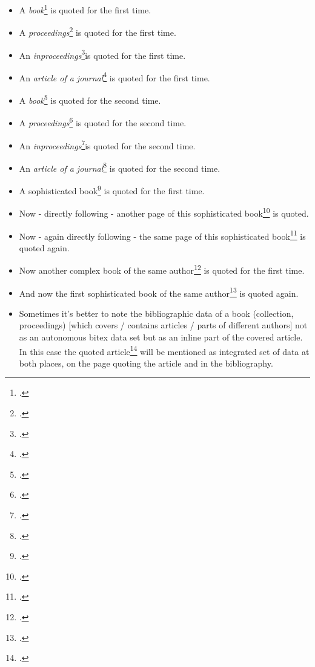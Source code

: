 \begin{itemize}
  \item A \textit{book}\footcite[cf.][123]{AllHen2008a} is quoted for the first time.
  \item A \textit{proceedings}\footcite[cf.][234]{Brachman1985a} is quoted for the first time.
  \item An \textit{inproceedings}\footcite[cf.][345]{Hays1985a}is quoted for the first time.
  \item An \textit{article of a journal}\footcite[cf.][456]{McCarthy1980a} is quoted for
  the first time.
  \item A \textit{book}\footcite[cf.][123]{AllHen2008a} is quoted for the second time.
  \item A \textit{proceedings}\footcite[cf.][234]{Brachman1985a} is quoted for the second
  time.
  \item An \textit{inproceedings}\footcite[cf.][345]{Hays1985a}is quoted for the
  second time.
  \item An \textit{article of a journal}\footcite[cf.][456]{McCarthy1980a} is quoted for the second time.
  \item A sophisticated book\footcite[cf.][567]{KantKdV1974} is quoted for the first time.
  \item Now - directly following - another page of this sophisticated
  book\footcite[cf.][678]{KantKdV1974} is quoted. 
  \item Now - again directly following - the same page of this sophisticated
  book\footcite[cf.][678]{KantKdV1974} is quoted again.
  \item Now another complex book of the same
  author\footcite[cf.][789]{KantKdU1974} is quoted for the first time.
  \item And now the first sophisticated book of the same
  author\footcite[cf.][789]{KantKdV1974} is quoted again.
  \item Sometimes it's better to note the bibliographic data of a book
  (collection, proceedings) [which covers / contains articles / parts of
  different authors] not as an autonomous bitex data set but as an inline part of
  the covered article. In this case the quoted article\footcite[cf.][23]{RotCum2011a} will be mentioned as integrated set of data at both places,
  on the page quoting the article and in the bibliography.
\end{itemize}




